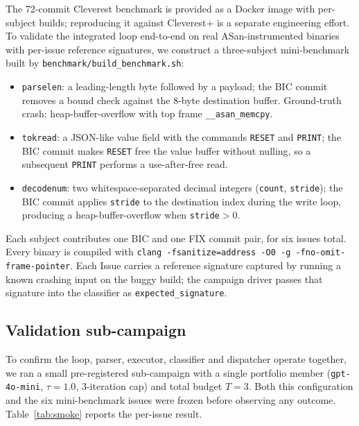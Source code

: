 \documentclass{article}
\begin{document}
The 72-commit Cleverest benchmark is provided as a Docker image with per-subject
builds; reproducing it against Cleverest+ is a separate engineering effort.  To
validate the integrated loop end-to-end on real ASan-instrumented binaries with
per-issue reference signatures, we construct a three-subject mini-benchmark
built by \texttt{benchmark/build\_benchmark.sh}:
\begin{itemize}[nosep]
  \item \texttt{parselen}: a leading-length byte followed by a payload; the
    BIC commit removes a bound check against the 8-byte destination buffer.
    Ground-truth crash: heap-buffer-overflow with top frame
    \texttt{\_\_asan\_memcpy}.
  \item \texttt{tokread}: a JSON-like value field with the commands
    \texttt{RESET} and \texttt{PRINT}; the BIC commit makes \texttt{RESET}
    free the value buffer without nulling, so a subsequent \texttt{PRINT}
    performs a use-after-free read.
  \item \texttt{decodenum}: two whitespace-separated decimal integers
    (\texttt{count}, \texttt{stride}); the BIC commit applies \texttt{stride}
    to the destination index during the write loop, producing a
    heap-buffer-overflow when \texttt{stride}$>0$.
\end{itemize}
Each subject contributes one BIC and one FIX commit pair, for six issues
total.  Every binary is compiled with
\texttt{clang -fsanitize=address -O0 -g -fno-omit-frame-pointer}.
Each Issue carries a reference signature captured by running a known
crashing input on the buggy build; the campaign driver passes that
signature into the classifier as \texttt{expected\_signature}.

\subsection{Validation sub-campaign}
\label{sec:integrated:smoke}

To confirm the loop, parser, executor, classifier and dispatcher operate
together, we ran a small pre-registered sub-campaign with a single portfolio
member (\texttt{gpt-4o-mini}, $\tau{=}1.0$, 3-iteration cap) and total budget
$T{=}3$.  Both this configuration and the six mini-benchmark issues were
frozen before observing any outcome.  Table~\ref{tab:smoke} reports the
per-issue result.
\end{document}
